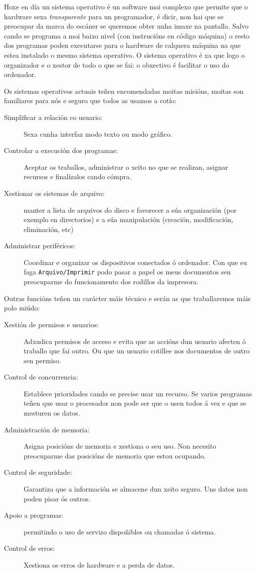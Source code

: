 Hoxe en día un sistema operativo é un software moi complexo que permite que o hardware sexa \textit{transparente} para un programador, é dicir, non hai que se preocupar da marca do escáner  se queremos obter unha imaxe na pantalla. Salvo cando se programa a moi baixo nivel (con instrucións en código máquina) o resto dos programas poden executarse para o hardware de calquera máquina na que estea instalado o mesmo  sistema operativo. O sistema operativo é xa que logo o organizador e o xestor de todo o que se fai: o obxectivo é facilitar o  uso do ordenador. 

Os sistemas operativos actuais teñen encomendadas moitas  misións, moitas son familiares para nós e seguro que todos as usamos a cotío:
\begin{singlespace}
\begin{description}
    \item[Simplificar a relación co usuario:] Sexa cunha interfaz modo texto ou modo gráfico.
    \item[Controlar a execución dos programas: ] Aceptar os traballos, administrar o xeito no que se realizan, asignar recursos e finalízalos cando cómpra.
    \item[Xestionar os sistemas de arquivo:] manter a lista de arquivos do disco e favorecer a súa organización (por exemplo en directorios) e a súa manipulación (creación, modificación, eliminación, etc)
    \item[Administrar periféricos:] Coordinar e organizar os dispositivos conectados ó ordenador. Con que eu faga \texttt{Arquivo/Imprimir} podo pasar a papel os meus documentos sen preocuparme do funcionamento dos rodillos da impresora.
\end{description}


Outras funcións teñen un carácter máis técnico e serán as que traballaremos máis polo miúdo:

\begin{description} 
    \item[Xestión de permisos e usuarios:] Adxudica permisos de acceso e evita que as accións dun usuario afecten ó traballo que fai outro. Ou que un usuario cotillee nos documentos de outro sen permiso.
    \item[Control de concurrencia:] Establece prioridades cando se precise usar un recurso. Se varios programas teñen que usar o procesador non pode ser que o usen todos á vez e que se mesturen os datos.
    \item[Administración de memoria:] Asigna posicións de memoria e xestiona o seu uso. Non necesito preocuparme das posicións de memoria que estou ocupando.
    \item[Control de seguridade:] Garantiza que a información se almacene dun xeito seguro. Uns datos non poden pisar ós outros.
    \item[Apoio a programas:] permitindo o uso de servizo dispoñibles ou chamadas ó sistema.
    \item[Control de erros:] Xestiona os erros de hardware e a perda de datos. 
\end{description}
\end{singlespace}

